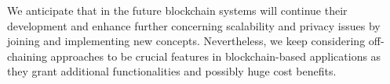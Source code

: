 We anticipate that in the future blockchain systems will continue their development and enhance further concerning scalability and privacy issues by joining and implementing new concepts. Nevertheless, we keep considering off-chaining approaches to be crucial features in blockchain-based applications as they grant additional functionalities and possibly huge cost benefits.


\newpage
